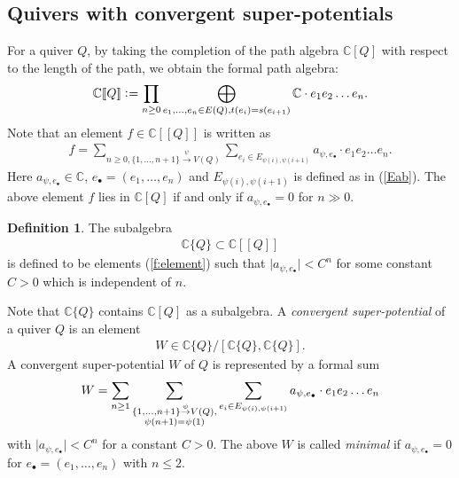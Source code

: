 \documentclass[11pt]{amsart}
\theoremstyle{plain}
\theoremstyle{definition}
\newtheorem{defi}[thm]{Definition}
\theoremstyle{remark}
\newcommand{\lkakko}{[\![}
\newcommand{\rkakko}{]\!]}
\begin{document}
\subsection{Quivers with convergent super-potentials}\label{subsec:conv}
For a quiver $Q$, by 
taking the completion of 
the path algebra $\mathbb{C}[Q]$ with respect to the 
length of the path, 
we obtain the formal 
path algebra:
\begin{align*}
\mathbb{C}\lkakko Q \rkakko \cneq 
\prod_{n\ge 0}
\bigoplus_{e_1, \ldots, e_n \in E(Q), t(e_i)=s(e_{i+1})} \mathbb{C} \cdot e_1 e_2 \ldots e_n.
\end{align*}
Note that an element $f \in \mathbb{C}\lkakko Q \rkakko$
is written as 
\begin{align}\label{f:element}
f=\sum_{n\ge 0, \{1, \ldots, n+1\} \stackrel{\psi}{\to} V(Q)}
\sum_{e_i \in E_{\psi(i), \psi(i+1)}}
a_{\psi, e_{\bullet}} \cdot e_1 e_2\ldots e_{n}. 
\end{align}
Here 
$a_{\psi, e_{\bullet}} \in \mathbb{C}$, 
$e_{\bullet}=(e_1, \ldots, e_n)$ and 
$E_{\psi(i), \psi(i+1)}$ is defined as in (\ref{Eab}). 
The above element $f$ lies in $\mathbb{C}[Q]$ if and only if
$a_{\psi, e_{\bullet}}=0$ for $n\gg 0$. 
\begin{defi}\label{def:CQ}
The subalgebra
\begin{align*}
\mathbb{C}\{ Q\} \subset \mathbb{C}\lkakko Q \rkakko
\end{align*}
is defined 
to be elements (\ref{f:element}) 
such that $\lvert a_{\psi, e_{\bullet}} \rvert <C^n$ for 
some constant $C>0$ which is independent of $n$. 
\end{defi}
Note that $\mathbb{C}\{Q\}$ contains $\mathbb{C}[Q]$ as 
a subalgebra. 
A \textit{convergent super-potential} of a quiver $Q$ is an element 
\begin{align*}
W \in \mathbb{C}\{ Q \}/[\mathbb{C}\{ Q \}, \mathbb{C}\{ Q \}]. 
\end{align*}
A convergent super-potential $W$ of $Q$ is represented by 
a formal sum
\begin{align}\label{form:W}
W=\sum_{n\ge 1}
\sum_{\begin{subarray}{c}
\{1, \ldots, n+1\} \stackrel{\psi}{\to} V(Q), \\
\psi(n+1)=\psi(1)
\end{subarray}}
\sum_{e_i \in E_{\psi(i), \psi(i+1)}}
a_{\psi, e_{\bullet}} \cdot e_1 e_2\ldots e_{n}
\end{align}
with $\lvert a_{\psi, e_{\bullet}} \rvert <C^n$
for a constant $C>0$. 
The above $W$ is called \textit{minimal}
if $a_{\psi, e_{\bullet}}=0$ for 
$e_{\bullet}=(e_1, \ldots, e_n)$ with $n\le 2$. 
\end{document}
